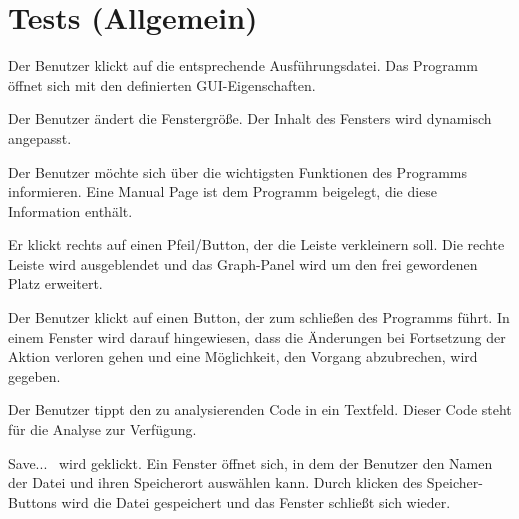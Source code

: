 \section{Tests (Allgemein)}



{Der Benutzer klickt auf die entsprechende Ausführungsdatei.}
{Das Programm öffnet sich mit den definierten GUI-Eigenschaften.}

{Der Benutzer ändert die Fenstergröße.}
{Der Inhalt des Fensters wird dynamisch angepasst.}

{Der Benutzer möchte sich über die wichtigsten Funktionen des Programms informieren.}
{Eine Manual Page ist dem Programm beigelegt, die diese Information enthält.}

{Er klickt rechts auf einen Pfeil/Button, der die Leiste verkleinern soll.}
{Die rechte Leiste wird ausgeblendet und das Graph-Panel wird um den frei gewordenen Platz erweitert.}

{Der Benutzer klickt auf einen Button, der zum schließen des Programms führt.}
{In einem Fenster wird darauf hingewiesen, dass die Änderungen bei Fortsetzung der Aktion verloren gehen und eine Möglichkeit, den Vorgang abzubrechen, wird gegeben.}




{Der Benutzer tippt den zu analysierenden Code in ein Textfeld.}
{Dieser Code steht für die Analyse zur Verfügung.}

{\glqq Save... \grqq\ wird geklickt.}
{Ein Fenster öffnet sich, in dem der Benutzer den Namen der Datei und ihren Speicherort auswählen kann. Durch klicken des \glqq Speicher\grqq -Buttons wird die Datei gespeichert und das Fenster schließt sich wieder.}


